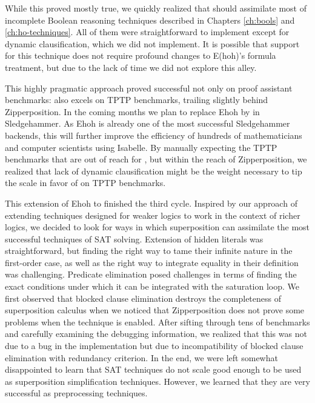 While this proved mostly true, we quickly realized that \ehohii{} should
assimilate most of incomplete Boolean reasoning techniques described in Chapters
\ref{ch:bools} and \ref{ch:ho-techniques}. All of them were straightforward to
implement except for dynamic clausification, which we did not implement. It is
possible that support for this technique does not require profound changes to
E(hoh)'s formula treatment, but due to the lack of time we did not explore this
alley.

This highly pragmatic approach proved successful not only on proof assistant
benchmarks: \ehohii{} also excels on TPTP benchmarks, trailing slightly behind
Zipperposition. In the coming months we plan to replace Ehoh by \ehohii{} in Sledgehammer.
As Ehoh is already one of the most successful Sledgehammer backends,
this will further improve the efficiency of hundreds of mathematicians and computer scientists using Isabelle.
By manually expecting the TPTP benchmarks that are out of reach
for \ehohii{}, but within the reach of Zipperposition, we realized that lack of
dynamic clausification might be the weight necessary to tip the scale in
favor of \ehohii{} on TPTP benchmarks. 

This extension of Ehoh to \ehohii{} finished the third cycle. Inspired by our
approach of extending techniques designed for weaker logics to work in the
context of richer logics, we decided to look for ways in which superposition can
assimilate the most successful techniques of SAT solving. Extension of hidden
literals was straightforward, but finding the right way to tame their infinite
nature in the first-order case, as well as the right way to integrate equality
in their definition was challenging. Predicate elimination posed challenges in
terms of finding the exact conditions under which it can be integrated with the
saturation loop. We first observed that blocked clause elimination destroys the
completeness of superposition calculus when we noticed that Zipperposition does
not prove some problems when the technique is enabled. After sifting through tens of
benchmarks and carefully examining the debugging information, we realized that
this was not due to a bug in the implementation but due to incompatibility of
blocked clause elimination with redundancy criterion. In the end, we were left
somewhat disappointed to learn that SAT techniques do not scale good enough to be used
as superposition simplification techniques. However, we learned that they are
very successful as preprocessing techniques.

